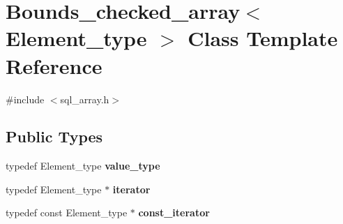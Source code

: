 \hypertarget{classBounds__checked__array}{}\section{Bounds\+\_\+checked\+\_\+array$<$ Element\+\_\+type $>$ Class Template Reference}
\label{classBounds__checked__array}


{\ttfamily \#include $<$sql\+\_\+array.\+h$>$}

\subsection*{Public Types}
\begin{DoxyCompactItemize}
\item 
\mbox{\label{classBounds__checked__array_a12cf65002f1a39921e23acde8b537aeb}} 
typedef Element\+\_\+type {\bfseries value\+\_\+type}
\item 
\mbox{\label{classBounds__checked__array_ac80a4b7b495a0185dd23b54930d5f9b0}} 
typedef Element\+\_\+type $\ast$ {\bfseries iterator}
\item 
\mbox{\label{classBounds__checked__array_ac69503b38752d8fe40b08354a4aec807}} 
typedef const Element\+\_\+type $\ast$ {\bfseries const\+\_\+iterator}
\end{DoxyCompactItemize}
